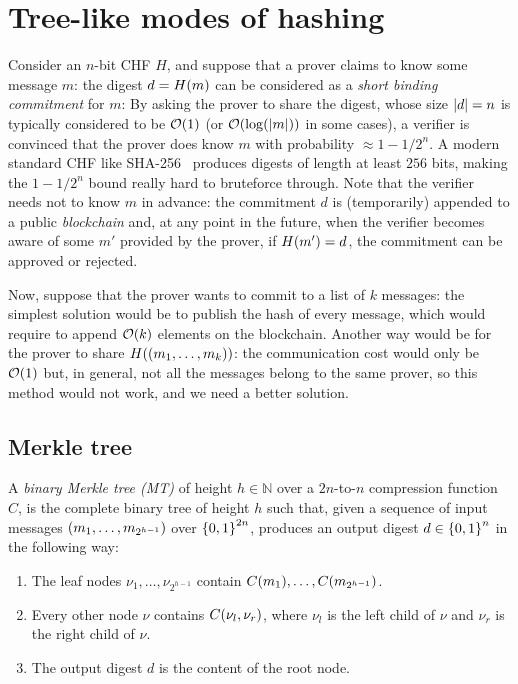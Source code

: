 \section{Tree-like modes of hashing}\label{sec:tree_hash}
Consider an \(n\)-bit CHF \(H\), and suppose that a prover claims to know some message \(m\): 
the digest \(d = \call{H}{m}\) can be considered as a \emph{short binding commitment} for \(m\): 
By asking the prover to share the digest, whose size \(\left\lvert d\right\rvert = n\) is typically considered to be 
\(\BigO{1}\) (or \(\BigO{\call{\log}{\abs{m}}}\) in some cases), a verifier is convinced that the 
prover does know \(m\) with probability \(\approx 1 - {1}/{2^n}\).
A modern standard CHF like SHA-256~\cite{Dang2015} produces digests of length at least \(256\) bits,
making the \(1 - {1}/{2^n}\) bound really hard to bruteforce through.
Note that the verifier needs not to know \(m\) in advance: the commitment \(d\) is (temporarily) 
appended to a public \emph{blockchain} and, at any point in the future, when the verifier becomes 
aware of some \(m'\) provided by the prover, if \(\call{H}{m'} = d\), the commitment can be 
approved or rejected.

Now, suppose that the prover wants to commit to a list of \(k\) messages: the simplest solution 
would be to publish the hash of every message, which would require to append \(\BigO{k}\) 
elements on the blockchain.
Another way would be for the prover to share \(\call{H}{\Tuple{m_1, \dots, m_k}}\): the 
communication cost would only be \(\BigO{1}\) but, in general, not all the messages belong to the 
same prover, so this method would not work, and we need a better solution.

\subsection{Merkle tree}
\begin{definition}
	A \emph{binary Merkle tree (MT)} of height \(h \in \mathbb{N}\) over a \(2n\)-to-\(n\) compression 
	function \(C\), is the complete binary tree of height \(h\) such that, given a sequence of input 
	messages \(\left(m_1, \dots, m_{2^{h-1}}\right)\) over \(\left\{0, 1\right\}^{2n}\), produces an
	output digest \(d \in \left\{0, 1\right\}^{n}\) in the following way:
	\begin{enumerate}
		\item The leaf nodes \(\nu_1, \dots, \nu_{2^{h-1}}\) contain 
					\(\call{C}{m_1}, \dots, \call{C}{m_{2^{h-1}}}\).
		\item Every other node \(\nu \) contains \(\call{C}{\nu_l, \nu_r}\), where \(\nu_l\) is
		      the left child of \(\nu \) and \(\nu_r\) is the right child of \(\nu \).
		\item The output digest \(d\) is the content of the root node. 
	\end{enumerate}
\end{definition}

